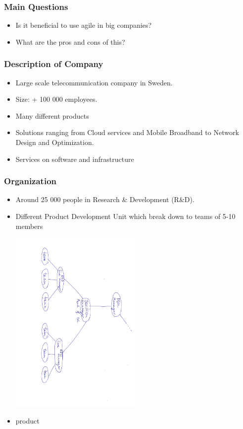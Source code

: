 \documentclass{beamer}
\begin{document}
\begin{frame}
  \frametitle{Main Questions}
  \begin{itemize}
  \item Is it beneficial to use agile in big companies?
  \item What are the pros and cons of this?
  \end{itemize}
\end{frame}

\begin{frame}
  \frametitle{Description of Company}
  \begin{itemize}
  \item  Large scale telecommunication company in Sweden.
  \item Size: + 100 000 employees.
  \item Many different products
  \item Solutions ranging from Cloud services and Mobile Broadband to Network Design and Optimization.
  \item Services on software and infrastructure

  \end{itemize}
\end{frame}

\begin{frame}
  \frametitle{Organization}
  \begin{itemize}
  \item Around 25 000 people in Research \& Development (R\&D).
  \item Different Product Development Unit which break down to teams of 5-10 members
    \begin{center}
    \includegraphics[width=0.5\textwidth, angle=90,origin=c]{figs/structure.pdf}
  \end{center}
  \item product
  \end{itemize}

\end{frame}
\end{document}
